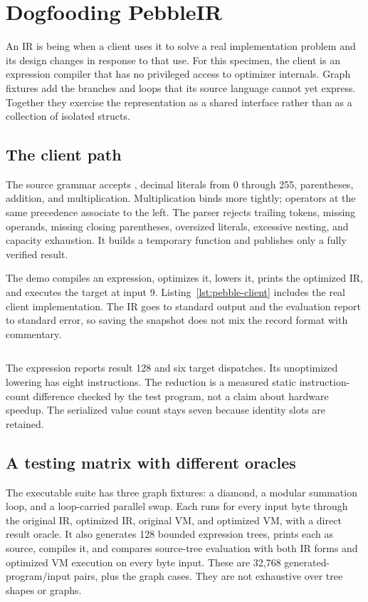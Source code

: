 \chapter{Dogfooding PebbleIR}
\label{ch:pebble-dogfooding}

An IR is being  when a client uses it to solve a real implementation problem and its design changes in response to that use.
For this specimen, the client is an expression compiler that has no privileged access to optimizer internals.
Graph fixtures add the branches and loops that its source language cannot yet express.
Together they exercise the representation as a shared interface rather than as a collection of isolated structs.

\section{The client path}
\label{sec:pebble-client-path}
The source grammar accepts , decimal literals from 0 through 255, parentheses, addition, and multiplication.
Multiplication binds more tightly; operators at the same precedence associate to the left.
The parser rejects trailing tokens, missing operands, missing closing parentheses, oversized literals, excessive nesting, and capacity exhaustion.
It builds a temporary function and publishes only a fully verified result.

The demo compiles an expression, optimizes it, lowers it, prints the optimized IR, and executes the target at input 9.
Listing~\ref{lst:pebble-client} includes the real client implementation.
The IR goes to standard output and the evaluation report to standard error, so saving the snapshot does not mix the record format with commentary.

\begin{listing}[htbp]
\inputminted{c}{example-code/pebbleir/demo.c}
\caption{A client uses the same public compile, optimize, lower, print, and execute interfaces as the tests.}
\label{lst:pebble-client}
\end{listing}

The expression  reports result 128 and six target dispatches.
Its unoptimized lowering has eight instructions.
The reduction is a measured static instruction-count difference checked by the test program, not a claim about hardware speedup.
The serialized value count stays seven because identity slots are retained.

\section{A testing matrix with different oracles}
\label{sec:pebble-test-matrix}
The executable suite has three graph fixtures: a diamond, a modular summation loop, and a loop-carried parallel swap.
Each runs for every input byte through the original IR, optimized IR, original VM, and optimized VM, with a direct result oracle.
It also generates 128 bounded expression trees, prints each as source, compiles it, and compares source-tree evaluation with both IR forms and optimized VM execution on every byte input.
These are 32,768 generated-program/input pairs, plus the graph cases.
They are not exhaustive over tree shapes or graphs.

